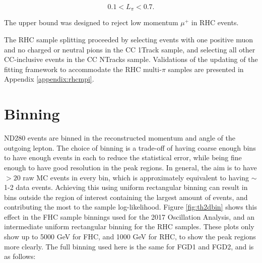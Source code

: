 \begin{equation}
0.1 < L_{\pi} < 0.7.
\end{equation}

The upper bound was designed to reject low momentum $\mu^+$ in RHC events. 

The RHC sample splitting proceeded by selecting events with one positive muon and no charged or neutral pions in the CC 1Track sample, and selecting all other CC-inclusive events in the CC NTracks sample. Validations of the updating of the fitting framework to accommodate the RHC multi-$\pi$ samples are presented in Appendix \ref{appendix:rhcmpi}.

\section{Binning}\label{sec:binning}

ND280 events are binned in the reconstructed momentum and angle of the outgoing lepton. The choice of binning is a trade-off of having coarse enough bins to have enough events in each to reduce the statistical error, while being fine enough to have good resolution in the peak regions. In general, the aim is to have $>20$ raw MC events in every bin, which is approximately equivalent to having $\sim$1-2 data events. Achieving this using uniform rectangular binning can result in bins outside the region of interest containing the largest amount of events, and contributing the most to the sample log-likelihood. Figure \ref{fig:th2dbin} shows this effect in the FHC sample binnings used for the 2017 Oscillation Analysis, and an intermediate uniform rectangular binning for the RHC samples. These plots only show up to 5000 GeV for FHC, and 1000 GeV for RHC, to show the peak regions more clearly. The full binning used here is the same for FGD1 and FGD2, and is as follows:

